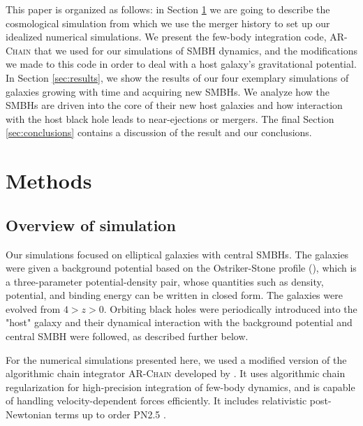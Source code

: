 \documentclass[english, apj]{emulateapj}
\begin{document}
This paper is organized as follows: in Section \ref{sec:methods} we are going to describe the cosmological simulation from which we use the merger history to set up our idealized numerical simulations. We present the few-body integration code, \textsc{AR-Chain} that we used for our simulations of SMBH dynamics, and the modifications we made to this code in order to deal with a host galaxy's gravitational potential. In Section \ref{sec:results}, we show the results of our four exemplary simulations of galaxies growing with time and acquiring new SMBHs. We analyze how the SMBHs are driven into the core of their new host galaxies and how interaction with the host black hole leads to near-ejections or mergers. The final Section \ref{sec:conclusions} contains a discussion of the result and our conclusions.


\section{Methods}\label{sec:methods}

\subsection{Overview of simulation}
Our simulations focused on elliptical galaxies with central SMBHs. The galaxies were given a background potential based on the Ostriker-Stone profile (\citet{2015ApJ...806L..28S}), which is a three-parameter potential-density pair, whose quantities such as density, potential, and binding energy can be written in closed form.  The galaxies were evolved from $4 > z > 0$.  Orbiting black holes were periodically introduced into the "host" galaxy and their dynamical interaction with the background potential and central SMBH were followed, as described further below.

For the numerical simulations presented here, we used a modified version of the algorithmic chain integrator \textsc{AR-Chain} developed by \citet{2006MNRAS.372..219M}. It uses algorithmic chain regularization for high-precision integration of few-body dynamics, and is capable of handling velocity-dependent forces efficiently. It includes relativistic post-Newtonian terms up to order PN2.5 \citep{2008AJ....135.2398M}.
\end{document}
